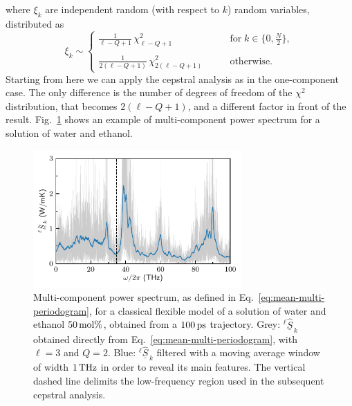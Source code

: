 where $\xi_k$ are independent random (with respect to $k$) random variables, distributed as
\begin{equation}
  \xi_k \sim
  \begin{cases}
    \frac{1}{\ell-Q+1} \,\chi^2_{\ell-Q+1}  \qquad & \mathrm{for} \; k \in \{0 , \frac{N}{2}\}, \\
 \\
 \frac{1}{2(\ell-Q+1)} \, \chi^2_{2(\ell-Q+1)} \qquad & \mathrm{otherwise}.
\end{cases}
\end{equation}
Starting from here we can apply the cepstral analysis as in the one-component case. The only difference is the number of degrees of freedom of the $\chi^2$ distribution, that becomes $2(\ell -Q+1)$, and a different factor in front of the result. Fig.~\ref{fig:grappa-periodogram} shows an example of multi-component power spectrum for a solution of water and ethanol.

\begin{figure}
\centering
\includegraphics[width=8cm]{chapters/chapter5/figures/psd_water_ethanol_40.pdf}
\caption{Multi-component power spectrum, as defined in Eq.~\eqref{eq:mean-multi-periodogram}, for a classical flexible model of a solution of water and ethanol $50\,\mathrm{mol}\%$, obtained from a $100\,\mathrm{ps}$ trajectory. Grey: $^{\ell}\hat{\underline{S}}_{\,k}$ obtained directly from Eq.~\eqref{eq:mean-multi-periodogram}, with $\ell=3$ and $Q=2$. Blue: $^{\ell}\hat{\underline{S}}_{\,k}$ filtered with a moving average window of width $1\,\mathrm{THz}$ in order to reveal its main features. The vertical dashed line delimits the low-frequency region used in the subsequent cepstral analysis.}  \label{fig:grappa-periodogram}
\end{figure}

